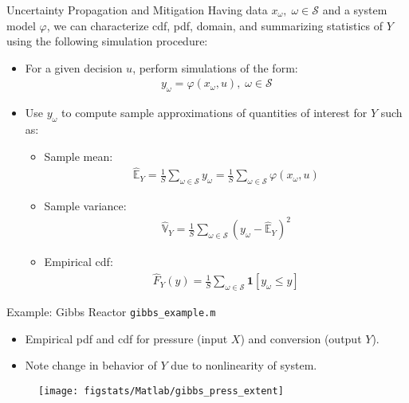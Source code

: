 \documentclass[9pt]{beamer}
\begin{document}
%
\begin{frame}{Uncertainty Propagation and Mitigation}
Having data $x_\omega,\; \omega \in \mathcal{S}$ and a system model $\varphi$, we can characterize cdf, pdf, domain, and summarizing statistics of $Y$ using the following simulation procedure:
\begin{block}{}
\begin{itemize}
\item For a given decision $u$, perform simulations of the form:
\begin{align*}
y_\omega=\varphi(x_\omega,u),\; \omega \in \mathcal{S}
\end{align*} 
\item Use $y_\omega$ to compute sample approximations of quantities of interest for $Y$ such as:

\begin{itemize}
\item Sample mean:
\begin{align*}
 \hat{\mathbb{E}}_Y=\frac{1}{S}\sum_{\omega \in \mathcal{S}}y_\omega=\frac{1}{S}\sum_{\omega \in \mathcal{S}}\varphi(x_\omega,u)
 \end{align*}
\item Sample variance: 
\begin{align*}
\hat{\mathbb{V}}_Y=\frac{1}{S}\sum_{\omega \in \mathcal{S}}(y_\omega-\hat{\mathbb{E}}_Y)^2
\end{align*} 
\item Empirical cdf: 
\begin{align*}
\hat{F}_Y(y)=\frac{1}{S}\sum_{\omega \in \mathcal{S}}\mathbf{1}[y_\omega \leq y] 
\end{align*}
\end{itemize}
\end{itemize}
\end{block}
\end{frame}

\begin{frame}{Example: Gibbs Reactor \footnotesize{\texttt{gibbs\_example.m}}}
\begin{itemize}
\item Empirical pdf and cdf for pressure (input $X$) and conversion (output $Y$). 
\item Note change in behavior of $Y$ due to nonlinearity of system. 
\end{itemize}
\begin{figure}[!htb]
    \centering
	\texttt{[image: figstats/Matlab/gibbs\_press\_extent]}
\end{figure}

\end{frame}
\end{document}
